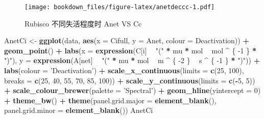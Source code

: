 \documentclass[
]{krantz}
\makeatletter
\newenvironment{Shaded}{\begin{snugshade}}{\end{snugshade}}
\newcommand{\DataTypeTok}[1]{\textcolor[rgb]{0.13,0.29,0.53}{#1}}
\newcommand{\DecValTok}[1]{\textcolor[rgb]{0.00,0.00,0.81}{#1}}
\newcommand{\KeywordTok}[1]{\textcolor[rgb]{0.13,0.29,0.53}{\textbf{#1}}}
\newcommand{\NormalTok}[1]{#1}
\newcommand{\OperatorTok}[1]{\textcolor[rgb]{0.81,0.36,0.00}{\textbf{#1}}}
\newcommand{\StringTok}[1]{\textcolor[rgb]{0.31,0.60,0.02}{#1}}
\newenvironment{kframe}{%
\medskip{}
\setlength{\fboxsep}{.8em}
 \def\at@end@of@kframe{}%
 \ifinner\ifhmode%
  \def\at@end@of@kframe{\end{minipage}}%
  \begin{minipage}{\columnwidth}%
 \fi\fi%
 \def\FrameCommand##1{\hskip\@totalleftmargin \hskip-\fboxsep
 \colorbox{shadecolor}{##1}\hskip-\fboxsep
     \hskip-\linewidth \hskip-\@totalleftmargin \hskip\columnwidth}%
 \MakeFramed {\advance\hsize-\width
   \@totalleftmargin\z@ \linewidth\hsize
   \@setminipage}}%
 {\par\unskip\endMakeFramed%
 \at@end@of@kframe}
\renewenvironment{Shaded}{\begin{kframe}}{\end{kframe}}
\makeatother
\begin{document}
\begin{figure}
\centering
\texttt{[image: bookdown\_files/figure-latex/anetdeccc-1.pdf]}
\caption{\label{fig:anetdeccc}Rubisco 不同失活程度时 Anet VS Cc}
\end{figure}

\begin{Shaded}
\begin{Highlighting}[]
\NormalTok{AnetCi <-}
\StringTok{  }\KeywordTok{ggplot}\NormalTok{(data, }\KeywordTok{aes}\NormalTok{(}\DataTypeTok{x =}\NormalTok{ Cifull, }\DataTypeTok{y =}\NormalTok{ Anet, }\DataTypeTok{colour =}\NormalTok{ Deactivation)) }\OperatorTok{+}
\StringTok{  }\KeywordTok{geom_point}\NormalTok{() }\OperatorTok{+}
\StringTok{  }\KeywordTok{labs}\NormalTok{(}\DataTypeTok{x =} \KeywordTok{expression}\NormalTok{(C[i] }\OperatorTok{~}\StringTok{ "("} \OperatorTok{*}\StringTok{ }\NormalTok{mu }\OperatorTok{*}\StringTok{ }\NormalTok{mol }\OperatorTok{~}\StringTok{ }\NormalTok{mol }\OperatorTok{^}\StringTok{ }\NormalTok{\{}
    \DecValTok{-1}
\NormalTok{  \} }\OperatorTok{*}\StringTok{ ")"}\NormalTok{),}
  \DataTypeTok{y =} \KeywordTok{expression}\NormalTok{(A[net] }\OperatorTok{~}\StringTok{ "("} \OperatorTok{*}\StringTok{ }\NormalTok{mu }\OperatorTok{*}\StringTok{ }\NormalTok{mol }\OperatorTok{~}\StringTok{ }\NormalTok{m }\OperatorTok{^}\StringTok{ }\NormalTok{\{}
    \DecValTok{-2}
\NormalTok{  \} }\OperatorTok{~}\StringTok{ }\NormalTok{s }\OperatorTok{^}\StringTok{ }\NormalTok{\{}
    \DecValTok{-1}
\NormalTok{  \} }\OperatorTok{*}\StringTok{ ")"}\NormalTok{)) }\OperatorTok{+}
\StringTok{  }\KeywordTok{labs}\NormalTok{(}\DataTypeTok{colour =} \StringTok{'Deactivation'}\NormalTok{) }\OperatorTok{+}
\StringTok{  }\KeywordTok{scale_x_continuous}\NormalTok{(}\DataTypeTok{limits =} \KeywordTok{c}\NormalTok{(}\DecValTok{25}\NormalTok{, }\DecValTok{100}\NormalTok{),}
                     \DataTypeTok{breaks =} \KeywordTok{c}\NormalTok{(}\DecValTok{25}\NormalTok{, }\DecValTok{40}\NormalTok{, }\DecValTok{55}\NormalTok{, }\DecValTok{70}\NormalTok{, }\DecValTok{85}\NormalTok{, }\DecValTok{100}\NormalTok{)) }\OperatorTok{+}
\StringTok{  }\KeywordTok{scale_y_continuous}\NormalTok{(}\DataTypeTok{limits =} \KeywordTok{c}\NormalTok{(}\OperatorTok{-}\DecValTok{5}\NormalTok{, }\DecValTok{5}\NormalTok{)) }\OperatorTok{+}
\StringTok{  }\KeywordTok{scale_colour_brewer}\NormalTok{(}\DataTypeTok{palette =} \StringTok{'Spectral'}\NormalTok{) }\OperatorTok{+}
\StringTok{  }\KeywordTok{geom_hline}\NormalTok{(}\DataTypeTok{yintercept =} \DecValTok{0}\NormalTok{) }\OperatorTok{+}
\StringTok{  }\KeywordTok{theme_bw}\NormalTok{() }\OperatorTok{+}
\StringTok{  }\KeywordTok{theme}\NormalTok{(}\DataTypeTok{panel.grid.major =} \KeywordTok{element_blank}\NormalTok{(),}
        \DataTypeTok{panel.grid.minor =} \KeywordTok{element_blank}\NormalTok{())}
\NormalTok{AnetCi}
\end{Highlighting}
\end{Shaded}
\end{document}
